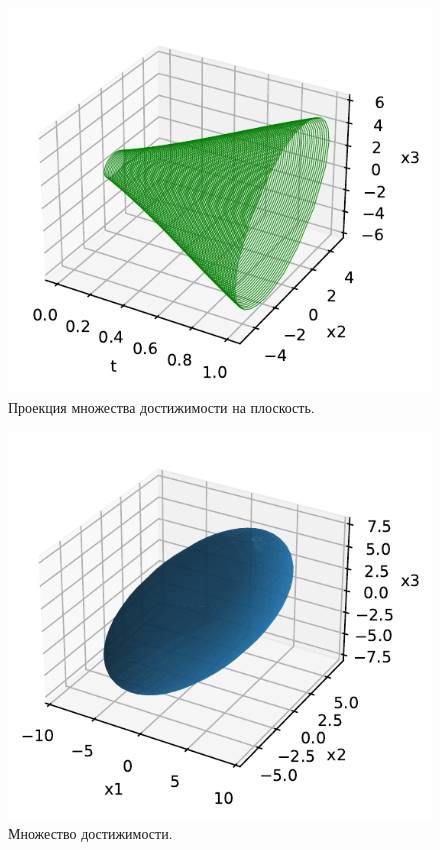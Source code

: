 \documentclass[16pt]{article}
\begin{document}
\newpage
\begin{figure}[h]
	\center
    \includegraphics[scale=0.8]{tube.pdf}
    \caption{Проекция множества достижимости на плоскость.}
\end{figure}

\begin{figure}[h]
	\center
    \includegraphics[scale=0.8]{set.pdf}
    \caption{Множество достижимости.}
\end{figure}
\end{document}
